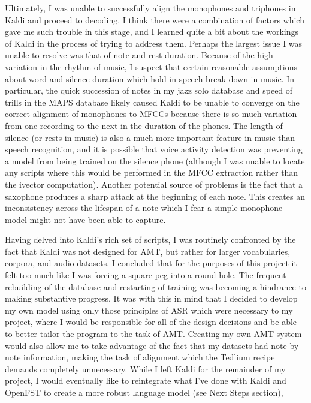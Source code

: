 \documentclass[conference]{IEEEtran}
\begin{document}
Ultimately, I was unable to successfully align the monophones and triphones in Kaldi and proceed to decoding. I think there were a combination of factors which gave me such trouble in this stage, and I learned quite a bit about the workings of Kaldi in the process of trying to address them. Perhaps the largest issue I was unable to resolve was that of note and rest duration. Because of the high variation in the rhythm of music, I suspect that certain reasonable assumptions about word and silence duration which hold in speech break down in music. In particular, the quick succession of notes in my jazz solo database and speed of trills in the MAPS database likely caused Kaldi to be unable to converge on the correct alignment of monophones to MFCCs because there is so much variation from one recording to the next in the duration of the phones. The length of silence (or rests in music) is also a much more important feature in music than speech recognition, and it is possible that voice activity detection was preventing a model from being trained on the silence phone (although I was unable to locate any scripts where this would be performed in the MFCC extraction rather than the ivector computation). Another potential source of problems is the fact that a saxophone produces a sharp attack at the beginning of each note. This creates an inconsistency across the lifespan of a note which I fear a simple monophone model might not have been able to capture. 

Having delved into Kaldi's rich set of scripts, I was routinely confronted by the fact that Kaldi was not designed for AMT, but rather for larger vocabularies, corpora, and audio datasets. I concluded that for the purposes of this project it felt too much like I was forcing a square peg into a round hole. The frequent rebuilding of the database and restarting of training was becoming a hindrance to making substantive progress. It was with this in mind that I decided to develop my own model using only those principles of ASR which were necessary to my project, where I would be responsible for all of the design decisions and be able to better tailor the program to the task of AMT. Creating my own AMT system would also allow me to take advantage of the fact that my datasets had note by note information, making the task of alignment which the Tedlium recipe demands completely unnecessary. While I left Kaldi for the remainder of my project, I would eventually like to reintegrate what I've done with Kaldi and OpenFST to create a more robust language model (see Next Steps section), 
\end{document}
